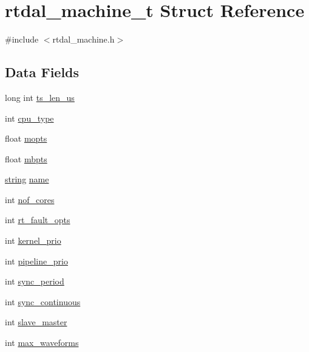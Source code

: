 \hypertarget{structrtdal__machine__t}{\section{rtdal\-\_\-machine\-\_\-t Struct Reference}
\label{structrtdal__machine__t}
}


{\ttfamily \#include $<$rtdal\-\_\-machine.\-h$>$}

\subsection*{Data Fields}
\begin{DoxyCompactItemize}
\item 
long int \hyperlink{structrtdal__machine__t_a3936ac0026875f5c55dee7beb42f851c}{ts\-\_\-len\-\_\-us}
\item 
int \hyperlink{structrtdal__machine__t_a2ce333c9436e5b4ab47b7560ba5cee1d}{cpu\-\_\-type}
\item 
float \hyperlink{structrtdal__machine__t_ac62f1bb089d649bb9cf5ad2d1c2e9d50}{mopts}
\item 
float \hyperlink{structrtdal__machine__t_a6414f7323760791df8a76ec90fcd5582}{mbpts}
\item 
\hyperlink{str_8h_a25093e36e9fb377b246945a84745823f}{string} \hyperlink{structrtdal__machine__t_a13c3d54f7150506a281019950397e605}{name}
\item 
int \hyperlink{structrtdal__machine__t_aac3563adebb6d638b13bc8ec653ee745}{nof\-\_\-cores}
\item 
int \hyperlink{structrtdal__machine__t_a9b0cff836cea88c3b44359d928412737}{rt\-\_\-fault\-\_\-opts}
\item 
int \hyperlink{structrtdal__machine__t_a6f33ae90fd88cb0bb88b41269f7836f1}{kernel\-\_\-prio}
\item 
int \hyperlink{structrtdal__machine__t_a8e553a91b8b34808eb8f20332fdc1189}{pipeline\-\_\-prio}
\item 
int \hyperlink{structrtdal__machine__t_a885449f1af2671677597b5b18cd05060}{sync\-\_\-period}
\item 
int \hyperlink{structrtdal__machine__t_a719bd75d0aa289f72a479c0346c6298b}{sync\-\_\-continuous}
\item 
int \hyperlink{structrtdal__machine__t_a6933855be619cf21e0b2d4846179795e}{slave\-\_\-master}
\item 
int \hyperlink{structrtdal__machine__t_a1603a33417a4f3f624aa59074d18348a}{max\-\_\-waveforms}
\item 

\end{DoxyCompactItemize}
